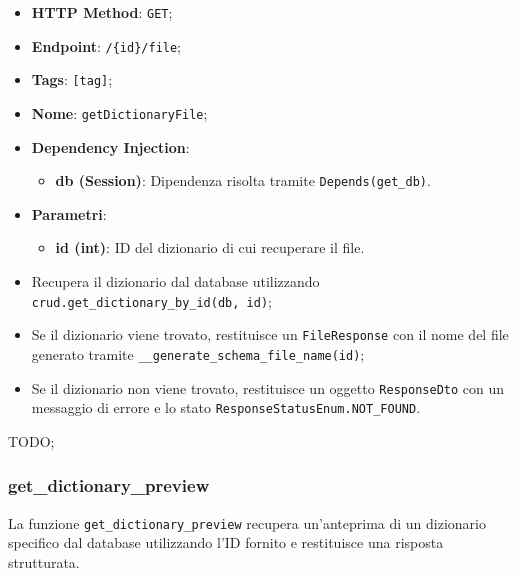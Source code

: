 \begin{itemize}
 \item \textbf{HTTP Method}: \texttt{GET};
 \item \textbf{Endpoint}: \texttt{/\{id\}/file};
 \item \textbf{Tags}: \texttt{[tag]};
 \item \textbf{Nome}: \texttt{getDictionaryFile};
 \item \textbf{Dependency Injection}:
  \begin{itemize}
    \item \textbf{db (Session)}: Dipendenza risolta tramite \texttt{Depends(get\_db)}.
  \end{itemize}
 \item \textbf{Parametri}:
  \begin{itemize}
    \item \textbf{id (int)}: ID del dizionario di cui recuperare il file.
  \end{itemize}
\end{itemize}

\begin{itemize}
 \item Recupera il dizionario dal database utilizzando \texttt{crud.get\_dictionary\_by\_id(db, id)};
 \item Se il dizionario viene trovato, restituisce un \texttt{FileResponse} con il nome del file generato tramite \texttt{\_\_generate\_schema\_file\_name(id)};
 \item Se il dizionario non viene trovato, restituisce un oggetto \texttt{ResponseDto} con un messaggio di errore e lo stato \texttt{ResponseStatusEnum.NOT\_FOUND}.
\end{itemize}

\par TODO;

\subsubsection{get\_dictionary\_preview}

\par La funzione \texttt{get\_dictionary\_preview} recupera un'anteprima di un dizionario specifico dal database utilizzando l'ID fornito e restituisce una risposta strutturata.

